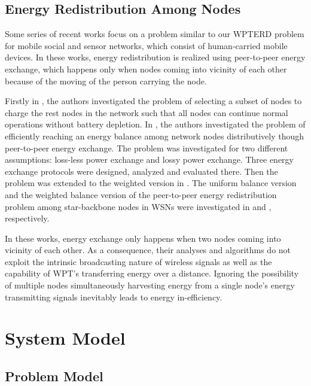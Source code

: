 \documentclass[journal,10pt]{IEEEtran}
\begin{document}
\subsection{Energy Redistribution Among Nodes}

Some series of recent works \cite{Bulut2014,Niko2016,Niko2017,Madhja2016,Madhja2017} focus on a problem similar to our WPTERD problem for mobile social and sensor networks, which consist of human-carried mobile devices. In these works, energy redistribution is realized using peer-to-peer energy exchange, which happens only when nodes coming into vicinity of each other because of the moving of the person carrying the node.

Firstly in \cite{Bulut2014}, the authors investigated the problem of selecting a subset of nodes to charge the rest nodes in the network such that all nodes can continue normal operations without battery depletion. In \cite{Niko2016}, the authors investigated the problem of efficiently reaching an energy balance among network nodes distributively though peer-to-peer energy exchange. The problem was investigated for two different assumptions: loss-less power exchange and lossy power exchange. Three energy exchange protocols were designed, analyzed and evaluated there. Then the problem was extended to the weighted version in \cite{Niko2017}. The uniform balance version and the weighted balance version of the peer-to-peer energy redistribution problem among star-backbone nodes in WSNs were investigated in \cite{Madhja2016} and \cite{Madhja2017}, respectively.

In these works, energy exchange only happens when two nodes coming into vicinity of each other. As a consequence, their analyses and algorithms do not exploit the intrinsic broadcasting nature of wireless signals as well as the capability of WPT's transferring energy over a distance. Ignoring the possibility of multiple nodes simultaneously harvesting energy from a single node's energy transmitting signals inevitably leads to energy in-efficiency.


\section{System Model}
\label{sec_model}
\subsection{Problem Model}
\end{document}
